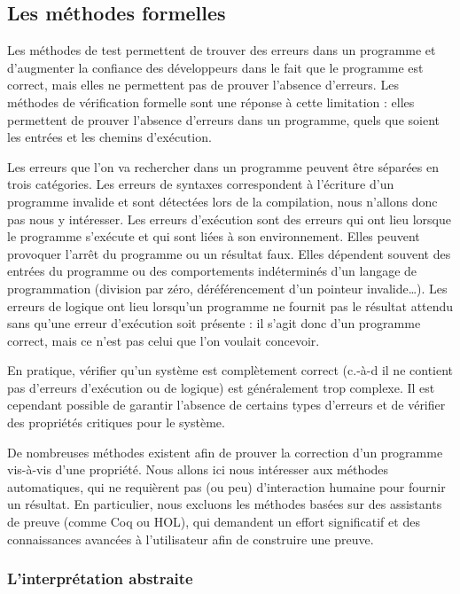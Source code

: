 \subsection{Les méthodes formelles}

Les méthodes de test permettent de trouver des erreurs dans un programme
et d'augmenter la confiance des développeurs dans le fait que le
programme est correct, mais elles ne permettent pas de prouver l'absence
d'erreurs.
Les méthodes de vérification formelle sont une réponse à cette limitation :
elles permettent de prouver l'absence d'erreurs dans un programme,
quels que soient les entrées et les chemins d'exécution.

Les erreurs que l'on va rechercher dans un programme peuvent être séparées en
trois catégories. Les erreurs de syntaxes correspondent à l'écriture d'un
programme invalide et sont détectées lors de la compilation, nous n'allons donc
pas nous y intéresser. Les erreurs d'exécution sont des erreurs qui ont lieu
lorsque le programme s'exécute et qui sont liées à son environnement. Elles
peuvent provoquer l'arrêt du programme ou un résultat faux. Elles dépendent souvent
des entrées du programme ou des comportements indéterminés d'un langage de
programmation (division par zéro, déréférencement d'un pointeur invalide\dots).
Les erreurs de logique ont lieu lorsqu'un programme ne fournit pas le résultat
attendu sans qu'une erreur d'exécution soit présente : il s'agit donc d'un
programme correct, mais ce n'est pas celui que l'on voulait concevoir.

En pratique, vérifier qu'un système est complètement correct (c.-à-d il ne
contient pas d'erreurs d'exécution ou de logique) est généralement trop
complexe. Il est cependant possible de garantir l'absence de certains types
d'erreurs et de vérifier des propriétés critiques pour le système.

De nombreuses méthodes existent afin de prouver la correction d'un
programme vis-à-vis d'une propriété. Nous allons ici nous intéresser aux
méthodes automatiques, qui ne requièrent pas (ou peu) d'interaction
humaine pour fournir un résultat. En particulier, nous excluons les
méthodes basées sur des assistants de preuve (comme Coq ou HOL), qui
demandent un effort significatif et des connaissances avancées à
l'utilisateur afin de construire une preuve.

\subsubsection{L'interprétation abstraite}


